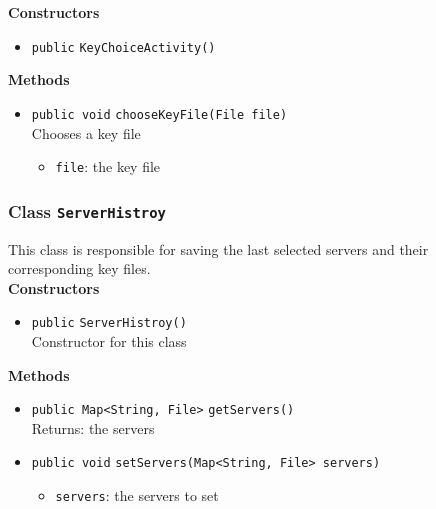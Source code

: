\textbf{Constructors}
\begin{itemize}
\item \lstinline|public| \lstinline|KeyChoiceActivity|\lstinline|()|




\end{itemize}


\textbf{Methods}
\begin{itemize}
\item \lstinline|public void| \lstinline|chooseKeyFile|\lstinline|(File file)|\\
Chooses a key file
\begin{itemize}
\item \lstinline|file|: the key file
\end{itemize}



\end{itemize}

\subsubsection{Class \lstinline|ServerHistroy|}
This class is responsible for saving the last selected servers
 and their corresponding key files. \\




\textbf{Constructors}
\begin{itemize}
\item \lstinline|public| \lstinline|ServerHistroy|\lstinline|()|\\
Constructor for this class



\end{itemize}


\textbf{Methods}
\begin{itemize}
\item \lstinline|public Map<String, File>| \lstinline|getServers|\lstinline|()|\\
Returns: the servers



\item \lstinline|public void| \lstinline|setServers|\lstinline|(Map<String, File> servers)|

\begin{itemize}
\item \lstinline|servers|: the servers to set
\end{itemize}



\end{itemize}



